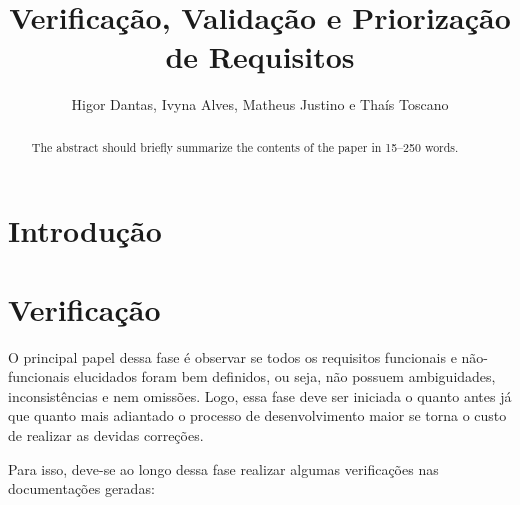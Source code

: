 \documentclass[runningheads]{llncs}
\begin{document}
%
\title{Verificação, Validação e Priorização de Requisitos}
%
\author{Higor Dantas,
Ivyna Alves, Matheus Justino e
Thaís Toscano}
%
%
%
\maketitle              %
%
\begin{abstract}
The abstract should briefly summarize the contents of the paper in
15--250 words.

\end{abstract}
%
%
%
\section{Introdução}

\section{Verificação}
O principal papel dessa fase é observar se todos os requisitos funcionais e não-funcionais elucidados foram bem definidos, ou seja, não possuem ambiguidades, inconsistências e nem omissões. Logo, essa fase deve ser iniciada o quanto antes já que quanto mais adiantado o processo de desenvolvimento maior se torna o custo de realizar as devidas correções.

Para isso, deve-se ao longo dessa fase realizar algumas verificações nas documentações geradas:
\end{document}
